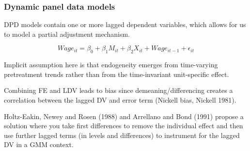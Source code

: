 \documentclass[12 pt, leqno]{article}
\begin{document}
\subsubsection{Dynamic panel data models}

DPD models contain one or more lagged dependent variables, which allows for us to model a partial adjustment mechanism. 

$$ Wage_{it} = \beta_0 + \beta_1 M_{it} + \beta_2 X_{it} + Wage_{it-1} + \epsilon_{it}$$

Implicit assumption here is that endogeneity emerges from time-varying pretreatment trends rather than from the time-invariant unit-specific effect.

Combining FE and LDV leads to bias since demeaning/differencing creates a correlation between the lagged DV and error term (Nickell bias, Nickell 1981).

Holtz-Eakin, Newey and Rosen (1988) and Arrellano and Bond (1991) propose a solution where you take first differences to remove the individual effect and then use further lagged terms (in levels and differences) to instrument for the lagged DV in a GMM context. 
\end{document}
